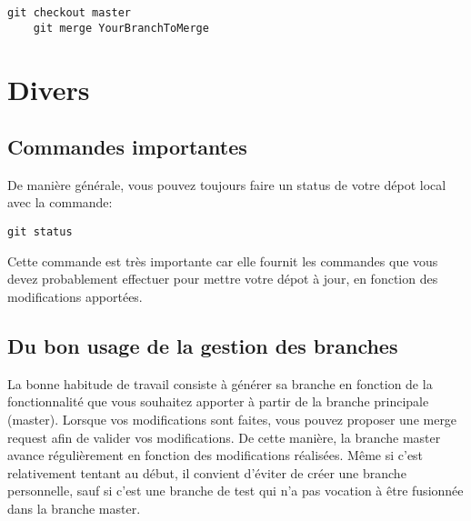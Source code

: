 \documentclass[a4paper,11pt]{article}
\begin{document}
	\begin{lstlisting}[style=BashInputStyle]
	git checkout master
	git merge YourBranchToMerge
	\end{lstlisting}
	\bigskip


\section{Divers}

	\subsection{Commandes importantes}

	De manière générale, vous pouvez toujours faire un status de votre dépot local avec la commande:
	\bigskip

	\begin{lstlisting}[style=BashInputStyle]
	git status
	\end{lstlisting}
	\bigskip
	
	Cette commande est très importante car elle fournit les commandes que vous devez probablement effectuer pour mettre votre dépot à jour, en fonction des modifications apportées.

	\subsection{Du bon usage de la gestion des branches}
	La bonne habitude de travail consiste à générer sa branche en fonction de la fonctionnalité que vous souhaitez apporter à partir de la branche principale (master). Lorsque vos modifications sont faites, vous pouvez proposer une merge request afin de valider vos modifications. De cette manière, la branche master avance régulièrement en fonction des modifications réalisées. Même si c'est relativement tentant au début, il convient d'éviter de créer une branche personnelle, sauf si c'est une branche de test qui n'a pas vocation à être fusionnée dans la branche master.
\end{document}
